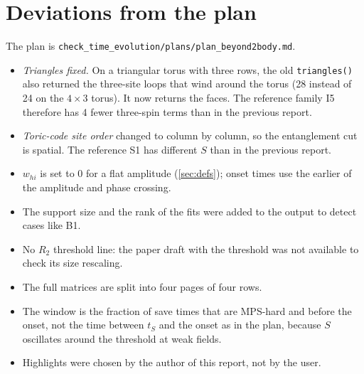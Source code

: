 \documentclass[11pt,a4paper]{article}
\newcommand{\whi}{w_{hi}}
\begin{document}
\section{Deviations from the plan}
\label{app:deviations}
The plan is \texttt{check\_time\_evolution/plans/plan\_beyond2body.md}.
\begin{itemize}
  \item \emph{Triangles fixed.} On a triangular torus with three rows, the old \texttt{triangles()} also returned the
    three-site loops that wind around the torus (28 instead of 24 on the $4\times3$ torus). It now returns the faces.
    The reference family I5 therefore has 4 fewer three-spin terms than in the previous report.
  \item \emph{Toric-code site order} changed to column by column, so the entanglement cut is spatial. The reference
    S1 has different $S$ than in the previous report.
  \item $\whi$ is set to $0$ for a flat amplitude (\cref{sec:defs}); onset times use the earlier of the amplitude
    and phase crossing.
  \item The support size and the rank of the fits were added to the output to detect cases like B1.
  \item No $R_2$ threshold line: the paper draft with the threshold was not available to check its size rescaling.
  \item The full matrices are split into four pages of four rows.
  \item The window is the fraction of save times that are MPS-hard and before the onset, not the time between $t_S$
    and the onset as in the plan, because $S$ oscillates around the threshold at weak fields.
  \item Highlights were chosen by the author of this report, not by the user.
\end{itemize}



\end{document}
